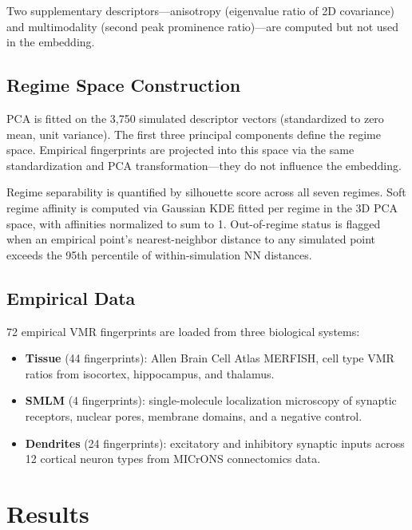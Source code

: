 \documentclass[11pt,a4paper]{article}
\begin{document}
Two supplementary descriptors---anisotropy (eigenvalue ratio of 2D
covariance) and multimodality (second peak prominence ratio)---are
computed but not used in the embedding.

\subsection{Regime Space Construction}

PCA is fitted on the 3,750 simulated descriptor vectors (standardized to
zero mean, unit variance). The first three principal components define the
regime space. Empirical fingerprints are projected into this space via the
same standardization and PCA transformation---they do not influence the
embedding.

Regime separability is quantified by silhouette score across all seven
regimes. Soft regime affinity is computed via Gaussian KDE fitted per
regime in the 3D PCA space, with affinities normalized to sum to 1.
Out-of-regime status is flagged when an empirical point's nearest-neighbor
distance to any simulated point exceeds the 95th percentile of
within-simulation NN distances.

\subsection{Empirical Data}

72 empirical VMR fingerprints are loaded from three biological systems:

\begin{itemize}
  \item \textbf{Tissue} (44 fingerprints): Allen Brain Cell Atlas MERFISH,
    cell type VMR ratios from isocortex, hippocampus, and thalamus.
  \item \textbf{SMLM} (4 fingerprints): single-molecule localization
    microscopy of synaptic receptors, nuclear pores, membrane domains,
    and a negative control.
  \item \textbf{Dendrites} (24 fingerprints): excitatory and inhibitory
    synaptic inputs across 12 cortical neuron types from MICrONS
    connectomics data.
\end{itemize}


\section{Results}
\label{sec:results}
\end{document}
